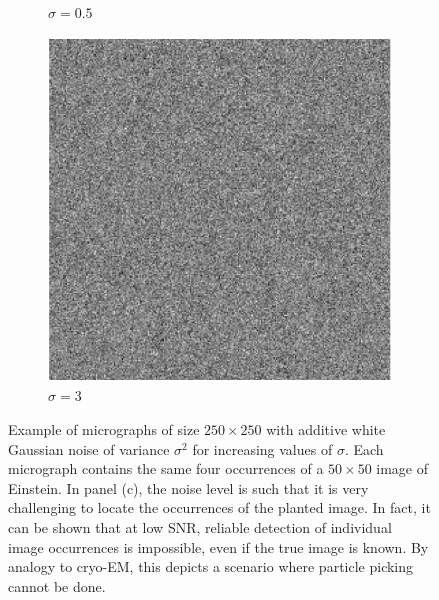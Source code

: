\documentclass[9pt,twocolumn,twoside,lineno]{pnas-new}
\begin{document}
\begin{figure}[h]
\begin{subfigure}[h]{0.33\textwidth}
		\caption{$\sigma = 0.5$}
	\end{subfigure}
	\begin{subfigure}[h]{0.33\textwidth}
		\centering
		\includegraphics[scale=0.5]{micrograph_Einstein_example_s3}
		\caption{$\sigma = 3$}
	\end{subfigure}
	\caption{\label{fig:micro_example} Example of micrographs of size $250\times 250$ with additive white Gaussian noise of variance $\sigma^2$ for increasing values of $\sigma$. Each micrograph contains the same four occurrences of a $50 \times 50$ image of Einstein. In panel (c), the noise level is such that it is very challenging to locate the occurrences of the planted image. In fact, it can be shown that at low SNR, reliable detection of individual image occurrences is impossible, even if the true image is known. By analogy to cryo-EM, this depicts a scenario where particle picking cannot be done.}	
\end{figure}
\end{document}

